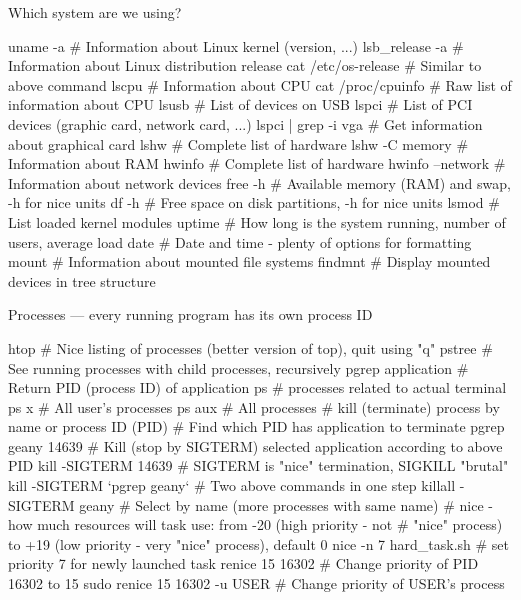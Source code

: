 \documentclass[compress, ucs, xelatex, 11pt, xcolor=svgnames,
  hyperref={
    bookmarks=true,
    unicode=true,
    colorlinks=true,
    pdftitle={Linux, command line and MetaCentrum},
    plainpages=false,
    pdfauthor={Vojtech Zeisek},
    pdfsubject={Course about use of Linux command line, writing shell scripts and using MetaCentrum of CESNET},
    pdfcreator={XeLaTeX},
    pdfkeywords={Linux, GNU, BASH, shell, command line, MetaCentrum},
    linkcolor=DarkRed,
    anchorcolor=DarkBlue,
    citecolor=Indigo,
    filecolor=NavyBlue,
    menucolor=DarkMagenta,
    urlcolor=DarkBlue,
    pdftex},
  url={hyphens, lowtilde} %
  ]{beamer}
\begin{document}
\begin{frame}[fragile]{Which system are we using?}
  \begin{bashcode}
    uname -a # Information about Linux kernel (version, ...)
    lsb_release -a # Information about Linux distribution release
    cat /etc/os-release # Similar to above command
    lscpu # Information about CPU
    cat /proc/cpuinfo # Raw list of information about CPU
    lsusb # List of devices on USB
    lspci # List of PCI devices (graphic card, network card, ...)
    lspci | grep -i vga # Get information about graphical card
    lshw # Complete list of hardware
    lshw -C memory # Information about RAM
    hwinfo # Complete list of hardware
    hwinfo --network # Information about network devices
    free -h # Available memory (RAM) and swap, -h for nice units
    df -h # Free space on disk partitions, -h for nice units
    lsmod # List loaded kernel modules
    uptime # How long is the system running, number of users, average load
    date # Date and time - plenty of options for formatting
    mount # Information about mounted file systems
    findmnt # Display mounted devices in tree structure
  \end{bashcode}
\end{frame}

\begin{frame}[fragile]{Processes --- every running program has its own process ID}
  \begin{bashcode}
    htop # Nice listing of processes (better version of top), quit using "q"
    pstree # See running processes with child processes, recursively
    pgrep application # Return PID (process ID) of application
    ps # processes related to actual terminal
    ps x # All user's processes
    ps aux # All processes
    # kill (terminate) process by name or process ID (PID)
    # Find which PID has application to terminate
    pgrep geany
    14639
    # Kill (stop by SIGTERM) selected application according to above PID
    kill -SIGTERM 14639 # SIGTERM is "nice" termination, SIGKILL "brutal"
    kill -SIGTERM `pgrep geany` # Two above commands in one step
    killall -SIGTERM geany # Select by name (more processes with same name)
    # nice - how much resources will task use: from -20 (high priority - not
    # "nice" process) to +19 (low priority - very "nice" process), default 0
    nice -n 7 hard_task.sh # set priority 7 for newly launched task
    renice 15 16302 # Change priority of PID 16302 to 15
    sudo renice 15 16302 -u USER # Change priority of USER's process
  \end{bashcode}
\end{frame}
\end{document}
